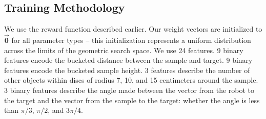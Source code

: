 \begin{table}
  \centering
  \vspace{8pt}
  \caption{Percent solved and standard deviation, along with time spent motion planning and number of calls to the motion
planner for the baseline system (B), our system with only learned refinement policies (no graph search heuristics) (L),
and our full system (F). Results using our system are averaged across 10 independently trained sets of weights. Time limit: 300s.}
  \label{table:results}
\end{table}

\subsection{Training Methodology}
We use the reward function described earlier. Our weight
vectors are initialized to $\vec{\mathbf{0}}$ for all parameter types -- this
initialization represents a uniform distribution across the limits of the geometric search space.
We use 24 features. 9 binary features encode the bucketed distance between the sample
and target. 9 binary features encode the bucketed sample height. 3 features
describe the number of other objects within discs of radius 7, 10, and 15 centimeters around the
sample. 3 binary features describe the angle made between the vector from the
robot to the target and the vector from the sample to the target: whether the angle is less than
$\pi/3$, $\pi/2$, and $3\pi/4$.

